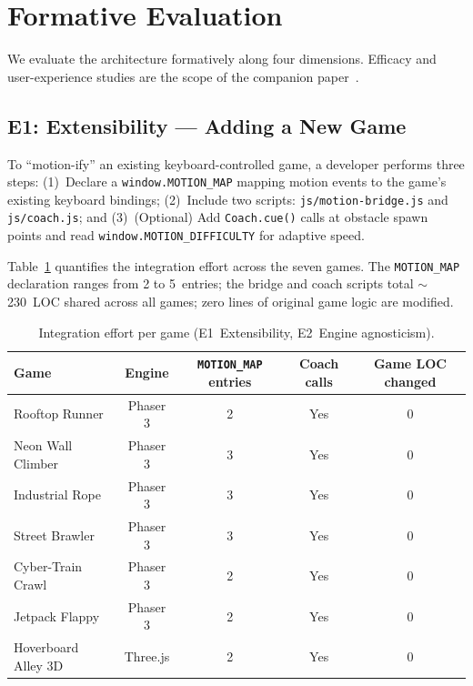 \documentclass[runningheads]{llncs}
\newcommand{\motionmap}{\texttt{MOTION\_MAP}}
\newcommand{\citecompanion}{\cite{companion2026}}
\begin{document}
\section{Formative Evaluation}
\label{sec:eval}

We evaluate the architecture formatively along four dimensions. Efficacy
and user-experience studies are the scope of the companion
paper~\citecompanion{}.

\subsection{E1: Extensibility --- Adding a New Game}
\label{sec:eval-ext}

To ``motion-ify'' an existing keyboard-controlled game, a developer
performs three steps:
(1)~Declare a \texttt{window.MOTION\_MAP} mapping motion events to the
game's existing keyboard bindings;
(2)~Include two scripts: \texttt{js/motion-bridge.js} and
\texttt{js/coach.js}; and
(3)~(Optional) Add \texttt{Coach.cue()} calls at obstacle spawn
points and read \texttt{window.MOTION\_DIFFICULTY} for adaptive speed.

Table~\ref{tab:effort} quantifies the integration effort across the seven
games. The \motionmap{} declaration ranges from 2 to 5~entries; the bridge
and coach scripts total $\sim$230~LOC shared across all games; zero lines
of original game logic are modified.

\begin{table}[htbp]
\centering
\caption{Integration effort per game (E1~Extensibility, E2~Engine agnosticism).}
\label{tab:effort}
\footnotesize
\begin{tabular}{@{}lcccc@{}}
\toprule
\textbf{Game} & \textbf{Engine} & \textbf{\motionmap{} entries} & \textbf{Coach calls} & \textbf{Game LOC changed} \\
\midrule
Rooftop Runner        & Phaser 3   & 2 & Yes & 0 \\
Neon Wall Climber     & Phaser 3   & 3 & Yes & 0 \\
Industrial Rope       & Phaser 3   & 3 & Yes & 0 \\
Street Brawler        & Phaser 3   & 3 & Yes & 0 \\
Cyber-Train Crawl     & Phaser 3   & 2 & Yes & 0 \\
Jetpack Flappy        & Phaser 3   & 2 & Yes & 0 \\
Hoverboard Alley 3D   & Three.js   & 2 & Yes & 0 \\
\bottomrule
\end{tabular}
\vspace{-1.5em}
\end{table}
\end{document}
